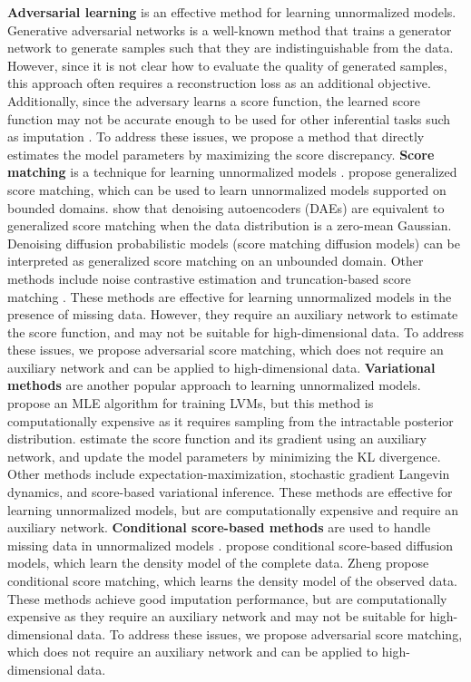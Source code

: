 \documentclass{article} %
\begin{document}
\textbf{Adversarial learning} is an effective method for learning unnormalized models. Generative adversarial networks is a well-known method that trains a generator network to generate samples such that they are indistinguishable from the data. However, since it is not clear how to evaluate the quality of generated samples, this approach often requires a reconstruction loss as an additional objective. Additionally, since the adversary learns a score function, the learned score function may not be accurate enough to be used for other inferential tasks such as imputation \citep{Uehara2020}. To address these issues, we propose a method that directly estimates the model parameters by maximizing the score discrepancy.
\textbf{Score matching} is a technique for learning unnormalized models \citep{Hyvarinen2005, Hyvarinen2007, Song2019}. \citet{Hyvarinen2007} propose generalized score matching, which can be used to learn unnormalized models supported on bounded domains. \citet{Vincent2011, Swersky2011} show that denoising autoencoders (DAEs) are equivalent to generalized score matching when the data distribution is a zero-mean Gaussian. Denoising diffusion probabilistic models (score matching diffusion models) can be interpreted as generalized score matching on an unbounded domain. Other methods include noise contrastive estimation and truncation-based score matching \citep{Liu2022}. These methods are effective for learning unnormalized models in the presence of missing data. However, they require an auxiliary network to estimate the score function, and may not be suitable for high-dimensional data. To address these issues, we propose adversarial score matching, which does not require an auxiliary network and can be applied to high-dimensional data.
\textbf{Variational methods} are another popular approach to learning unnormalized models. \citet{Vertes2016} propose an MLE algorithm for training LVMs, but this method is computationally expensive as it requires sampling from the intractable posterior distribution. \citet{Bao2020, Bao2021} estimate the score function and its gradient using an auxiliary network, and update the model parameters by minimizing the KL divergence. Other methods include expectation-maximization, stochastic gradient Langevin dynamics, and score-based variational inference. These methods are effective for learning unnormalized models, but are computationally expensive and require an auxiliary network.
\textbf{Conditional score-based methods} are used to handle missing data in unnormalized models \citep{Tashiro2021}. \citet{Tashiro2021} propose conditional score-based diffusion models, which learn the density model of the complete data. Zheng propose conditional score matching, which learns the density model of the observed data. These methods achieve good imputation performance, but are computationally expensive as they require an auxiliary network and may not be suitable for high-dimensional data. To address these issues, we propose adversarial score matching, which does not require an auxiliary network and can be applied to high-dimensional data.
\end{document}
